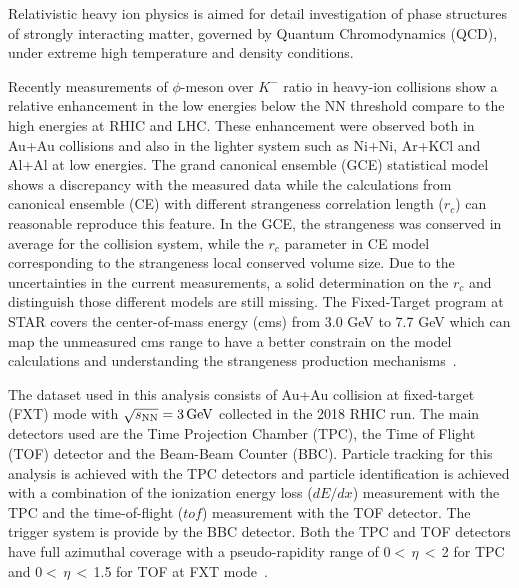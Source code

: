 \documentclass[%
 reprint,	
showpacs,
 amsmath,amssymb,
 aps,
 prc,
]{revtex4-1}
\begin{document}
\maketitle


Relativistic heavy ion physics is aimed for detail investigation of phase structures of strongly interacting matter, governed by Quantum Chromodynamics (QCD), under extreme high temperature and density conditions. 


Recently measurements of $\phi$-meson over $K^-$ ratio in heavy-ion collisions show a relative enhancement in the low energies below the NN threshold compare to the high energies at RHIC and LHC. These enhancement were observed both in Au+Au collisions and also in the lighter system such as Ni+Ni, Ar+KCl and Al+Al at low energies. The grand canonical ensemble (GCE) statistical model shows a discrepancy with the measured data while the calculations from canonical ensemble (CE) with different strangeness correlation length ($r_c$) can reasonable reproduce this feature. In the GCE, the strangeness was conserved in average for the collision system, while the $r_c$ parameter in CE model corresponding to the strangeness local conserved volume size. Due to the uncertainties in the current measurements, a solid determination on the $r_c$ and distinguish those different models are still missing. The Fixed-Target program at STAR covers the center-of-mass energy (cms) from 3.0 GeV to 7.7 GeV which can map the unmeasured cms range to have a better constrain on the model calculations and understanding the strangeness production mechanisms~\cite{}.


The dataset used in this analysis consists of Au+Au collision at fixed-target (FXT) mode with ${\sqrt{s_{\rm NN}} = \rm{3\,GeV}}$ collected in the 2018 RHIC run. The main detectors used are the Time Projection Chamber (TPC), the Time of Flight (TOF) detector and the Beam-Beam Counter (BBC). Particle tracking for this analysis is achieved with the TPC detectors and particle identification is achieved with a combination of the ionization energy loss ($dE/dx$) measurement with the TPC and the time-of-flight ($tof$) measurement with the TOF detector. The trigger system is provide by the BBC detector. Both the TPC and TOF detectors have full azimuthal coverage with a pseudo-rapidity range of 0$<$\,$\eta$\,$<$\,2 for TPC and 0$<$\,$\eta$\,$<$\,1.5 for TOF at FXT mode~\cite{TPC,TOF}. 
\end{document}
